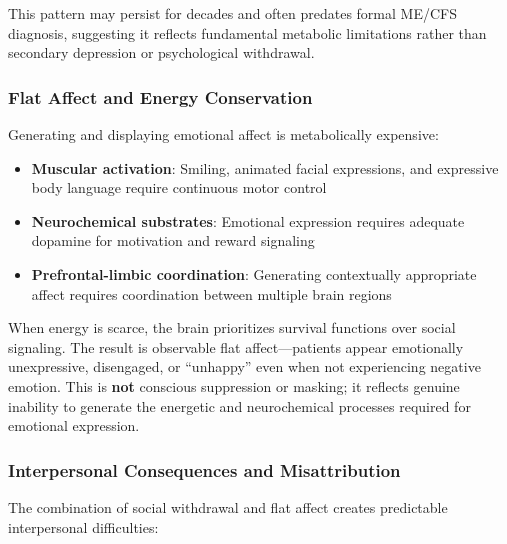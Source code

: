 This pattern may persist for decades and often predates formal ME/CFS diagnosis, suggesting it reflects fundamental metabolic limitations rather than secondary depression or psychological withdrawal.

\subsubsection{Flat Affect and Energy Conservation}

Generating and displaying emotional affect is metabolically expensive:

\begin{itemize}
    \item \textbf{Muscular activation}: Smiling, animated facial expressions, and expressive body language require continuous motor control
    \item \textbf{Neurochemical substrates}: Emotional expression requires adequate dopamine for motivation and reward signaling
    \item \textbf{Prefrontal-limbic coordination}: Generating contextually appropriate affect requires coordination between multiple brain regions
\end{itemize}

When energy is scarce, the brain prioritizes survival functions over social signaling. The result is observable flat affect---patients appear emotionally unexpressive, disengaged, or ``unhappy'' even when not experiencing negative emotion. This is \textbf{not} conscious suppression or masking; it reflects genuine inability to generate the energetic and neurochemical processes required for emotional expression.

\subsubsection{Interpersonal Consequences and Misattribution}

The combination of social withdrawal and flat affect creates predictable interpersonal difficulties:

